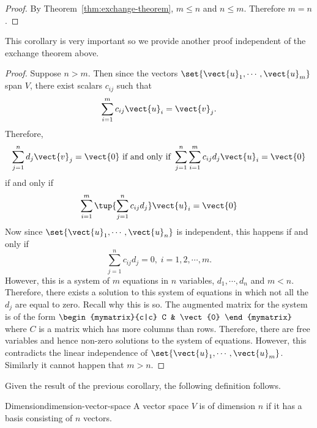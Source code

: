 \begin{proof} By Theorem~\ref{thm:exchange-theorem}, $m\leq n$ and $n\leq m$. Therefore $m=n$. 
\end{proof}

This corollary is very important so we provide another proof independent of the exchange theorem above.

\begin{proof}Suppose $n > m$. Then since the vectors $\set{\vect{u}
_{1},\cdots ,\vect{u}_{m}} $ span $V$, there exist scalars $c_{ij}$
such that 
\begin{equation*}
\sum_{i=1}^{m}c_{ij}\vect{u}_{i}=\vect{v}_{j}.
\end{equation*}
Therefore, 
\begin{equation*}
\sum_{j=1}^{n}d_{j}\vect{v}_{j}=\vect{0}
\text{ if and only if }\sum_{j=1}^{n}\sum_{i=1}^{m}c_{ij}d_{j}\vect{u}_{i}=
\vect{0}
\end{equation*}
if and only if 
\begin{equation*}
\sum_{i=1}^{m}\tup{\sum_{j=1}^{n}c_{ij}d_{j}} \vect{u}_{i}=\vect{
0}
\end{equation*}
Now since $\set{\vect{u}_{1},\cdots ,\vect{u}_{n}}$ is independent, this
happens if and only if 
\begin{equation*}
\sum_{j=1}^{n}c_{ij}d_{j}=0,\;i=1,2,\cdots ,m.
\end{equation*}
However, this is a system of $m$ equations in $n$ variables, $d_{1},\cdots
,d_{n}$ and $m<n$. Therefore, there exists a solution to this system of
equations in which not all the $d_{j}$ are equal to zero. Recall why this is
so. The augmented matrix for the system is of the form 
$\begin{mymatrix}{c|c}
C & \vect{0}
\end{mymatrix} $ where $C$ is a matrix which has more columns than rows. Therefore,
there are free variables and hence non-zero solutions to the system of
equations. However, this contradicts the linear independence of $\set{
\vect{u}_{1},\cdots ,\vect{u}_{m}}$. Similarly it cannot happen
that $m > n$.
\end{proof}

Given the result of the previous corollary, the following definition follows.

\begin{definition}{Dimension}{dimension-vector-space}
 A vector space $V$ is of dimension $n$ if it has a basis consisting of $n$ vectors.
\end{definition}


